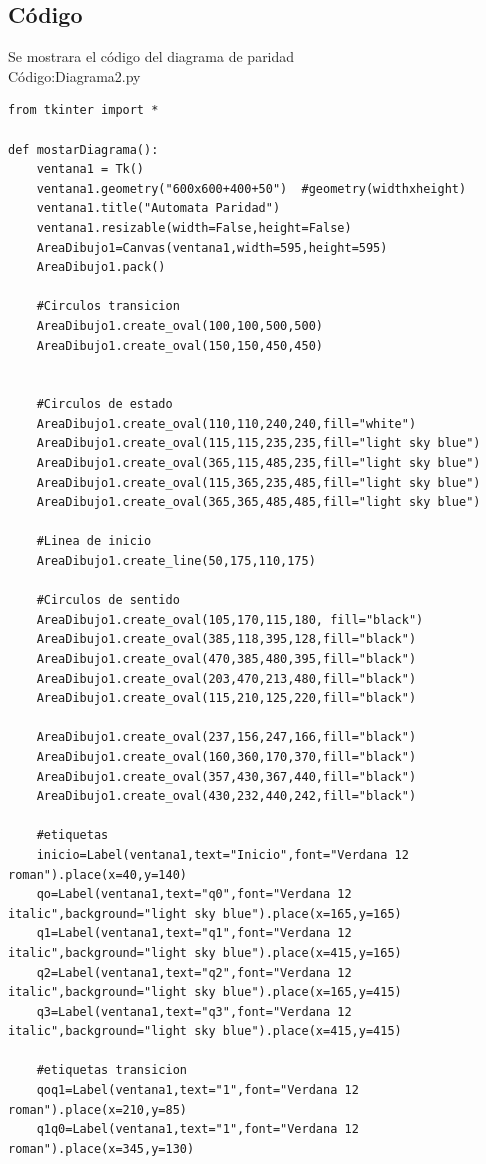 \documentclass[12pt,letterpaper]{article}
\begin{document}
\subsection{C\'odigo}
Se mostrara el c\'odigo del diagrama de paridad\\
C\'odigo:Diagrama2.py
\lstset{language=Python, breaklines=true, basicstyle=\footnotesize}
\begin{lstlisting}[frame=single]
from tkinter import *

def mostarDiagrama():
	ventana1 = Tk()
	ventana1.geometry("600x600+400+50")  #geometry(widthxheight)
	ventana1.title("Automata Paridad")
	ventana1.resizable(width=False,height=False)
	AreaDibujo1=Canvas(ventana1,width=595,height=595)
	AreaDibujo1.pack()

	#Circulos transicion
	AreaDibujo1.create_oval(100,100,500,500)
	AreaDibujo1.create_oval(150,150,450,450)


	#Circulos de estado
	AreaDibujo1.create_oval(110,110,240,240,fill="white")
	AreaDibujo1.create_oval(115,115,235,235,fill="light sky blue")
	AreaDibujo1.create_oval(365,115,485,235,fill="light sky blue")
	AreaDibujo1.create_oval(115,365,235,485,fill="light sky blue")
	AreaDibujo1.create_oval(365,365,485,485,fill="light sky blue")

	#Linea de inicio
	AreaDibujo1.create_line(50,175,110,175)

	#Circulos de sentido
	AreaDibujo1.create_oval(105,170,115,180, fill="black")
	AreaDibujo1.create_oval(385,118,395,128,fill="black")
	AreaDibujo1.create_oval(470,385,480,395,fill="black")
	AreaDibujo1.create_oval(203,470,213,480,fill="black")
	AreaDibujo1.create_oval(115,210,125,220,fill="black")

	AreaDibujo1.create_oval(237,156,247,166,fill="black")
	AreaDibujo1.create_oval(160,360,170,370,fill="black")
	AreaDibujo1.create_oval(357,430,367,440,fill="black")
	AreaDibujo1.create_oval(430,232,440,242,fill="black")

	#etiquetas
	inicio=Label(ventana1,text="Inicio",font="Verdana 12 roman").place(x=40,y=140)
	qo=Label(ventana1,text="q0",font="Verdana 12 italic",background="light sky blue").place(x=165,y=165)
	q1=Label(ventana1,text="q1",font="Verdana 12 italic",background="light sky blue").place(x=415,y=165)
	q2=Label(ventana1,text="q2",font="Verdana 12 italic",background="light sky blue").place(x=165,y=415)
	q3=Label(ventana1,text="q3",font="Verdana 12 italic",background="light sky blue").place(x=415,y=415)

	#etiquetas transicion
	qoq1=Label(ventana1,text="1",font="Verdana 12 roman").place(x=210,y=85)
	q1q0=Label(ventana1,text="1",font="Verdana 12 roman").place(x=345,y=130)


\end{lstlisting}
\end{document}

